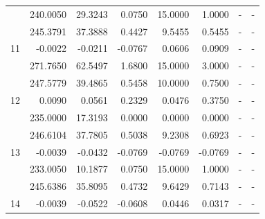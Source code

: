 \begin{table}[!htb]
{\begin{tabular}{c|r|r|r|r|r|r|r}
 & 240.0050 & 29.3243 & 0.0750 & 15.0000 & 1.0000 & - & - \\ \cline{2-8} 
 & 245.3791 & 37.3888 & 0.4427 & 9.5455 & 0.5455 & - & - \\ \cline{2-8} 
\multirow{-3}{*}{11} & \cellcolor[HTML]{ADDDAD}-0.0022 & \cellcolor[HTML]{ADDDAD}-0.0211 & -0.0767 & 0.0606 & 0.0909 & - & - \\ \hline
 & 271.7650 & 62.5497 & 1.6800 & 15.0000 & 3.0000 & - & - \\ \cline{2-8} 
 & 247.5779 & 39.4865 & 0.5458 & 10.0000 & 0.7500 & - & - \\ \cline{2-8} 
\multirow{-3}{*}{12} & \cellcolor[HTML]{ADDDAD}0.0090 & 0.0561 & 0.2329 & \cellcolor[HTML]{ADDDAD}0.0476 & 0.3750 & - & - \\ \hline
 & 235.0000 & 17.3193 & 0.0000 & 0.0000 & 0.0000 & - & - \\ \cline{2-8} 
 & 246.6104 & 37.7805 & 0.5038 & 9.2308 & 0.6923 & - & - \\ \cline{2-8} 
\multirow{-3}{*}{13} & \cellcolor[HTML]{ADDDAD}-0.0039 & \cellcolor[HTML]{ADDDAD}-0.0432 & -0.0769 & -0.0769 & -0.0769 & - & - \\ \hline
 & 233.0050 & 10.1877 & 0.0750 & 15.0000 & 1.0000 & - & - \\ \cline{2-8} 
 & 245.6386 & 35.8095 & 0.4732 & 9.6429 & 0.7143 & - & - \\ \cline{2-8} 
\multirow{-3}{*}{14} & \cellcolor[HTML]{ADDDAD}-0.0039 & -0.0522 & -0.0608 & \cellcolor[HTML]{ADDDAD}0.0446 & \cellcolor[HTML]{ADDDAD}0.0317 & - & - \\ \hline
\end{tabular}%
}
\end{table}

\FloatBarrier
\pagebreak

